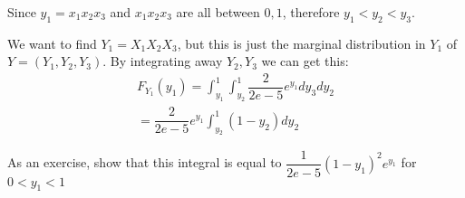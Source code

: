 \par\bigskip
\noindent Since $y_1 = x_1x_2x_3$ and $x_1x_2x_3$ are all between $0,1$, therefore $y_1<y_2<y_3$.
\par\bigskip
\noindent We want to find $Y_1 = X_1X_2X_3$, but this is just the marginal distribution in $Y_1$ of $Y = (Y_1,Y_2,Y_3)$. By integrating away $Y_2, Y_3$ we can get this:
\begin{equation*}
  \begin{gathered}
    F_{Y_1}(y_1) = \int_{y_1}^{1}\int_{y_2}^{1}\dfrac{2}{2e-5}e^{y_1}dy_3dy_2\\
    = \dfrac{2}{2e-5}e^{y_1}\int_{y_2}^{1}(1-y_2)dy_2
  \end{gathered}
\end{equation*}\par
\noindent As an exercise, show that this integral is equal to $\dfrac{1}{2e-5}(1-y_1)^2e^{y_1}$ for $0<y_1<1$
